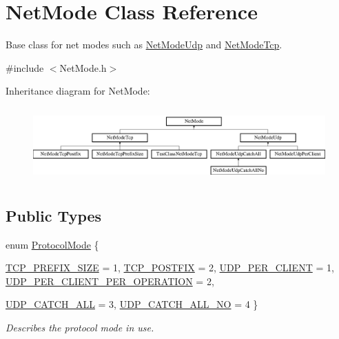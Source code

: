 \hypertarget{class_net_mode}{
\section{NetMode Class Reference}
\label{class_net_mode}
}


Base class for net modes such as \hyperlink{class_net_mode_udp}{NetModeUdp} and \hyperlink{class_net_mode_tcp}{NetModeTcp}.  




{\ttfamily \#include $<$NetMode.h$>$}

Inheritance diagram for NetMode:\begin{figure}[H]
\begin{center}
\leavevmode
\includegraphics[height=2.853503cm]{class_net_mode}
\end{center}
\end{figure}
\subsection*{Public Types}
\begin{DoxyCompactItemize}
\item 
enum \hyperlink{class_net_mode_a43cfa55ee6a4db66a8d7d6c27f766964}{ProtocolMode} \{ \par
\hyperlink{class_net_mode_a43cfa55ee6a4db66a8d7d6c27f766964a5fc5653d3c2a1e1b5a4306e7060b41c9}{TCP\_\-PREFIX\_\-SIZE} =  1, 
\hyperlink{class_net_mode_a43cfa55ee6a4db66a8d7d6c27f766964abe08876125a416186e74c901f6d29ce4}{TCP\_\-POSTFIX} =  2, 
\hyperlink{class_net_mode_a43cfa55ee6a4db66a8d7d6c27f766964abb3d396c14fdec8b8e5fd8a785dfba45}{UDP\_\-PER\_\-CLIENT} =  1, 
\hyperlink{class_net_mode_a43cfa55ee6a4db66a8d7d6c27f766964a947fd0828716fc0442ea546cce111c27}{UDP\_\-PER\_\-CLIENT\_\-PER\_\-OPERATION} =  2, 
\par
\hyperlink{class_net_mode_a43cfa55ee6a4db66a8d7d6c27f766964a158ce5f833cde150d209f480936b2b0a}{UDP\_\-CATCH\_\-ALL} =  3, 
\hyperlink{class_net_mode_a43cfa55ee6a4db66a8d7d6c27f766964ad4582c7d9e25f9fbd2cec99e4455386f}{UDP\_\-CATCH\_\-ALL\_\-NO} =  4
 \}
\begin{DoxyCompactList}\small\item\em Describes the protocol mode in use. \item\end{DoxyCompactList}\end{DoxyCompactItemize}
